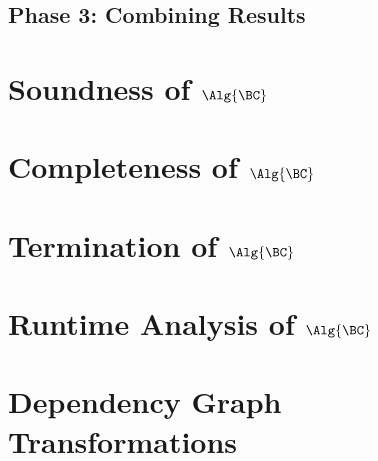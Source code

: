 \subsection{Phase 3: Combining Results}

\section{Soundness of $\Alg{\BC}$}\label{sec:bc-soundness}

\section{Completeness of $\Alg{\BC}$}\label{sec:bc-completeness}

\section{Termination of $\Alg{\BC}$}\label{sec:bc-termination}

\section{Runtime Analysis of $\Alg{\BC}$}\label{sec:bc-runtime-analysis}

\section{Dependency Graph Transformations}\label{sec:dep-graph-trans}


